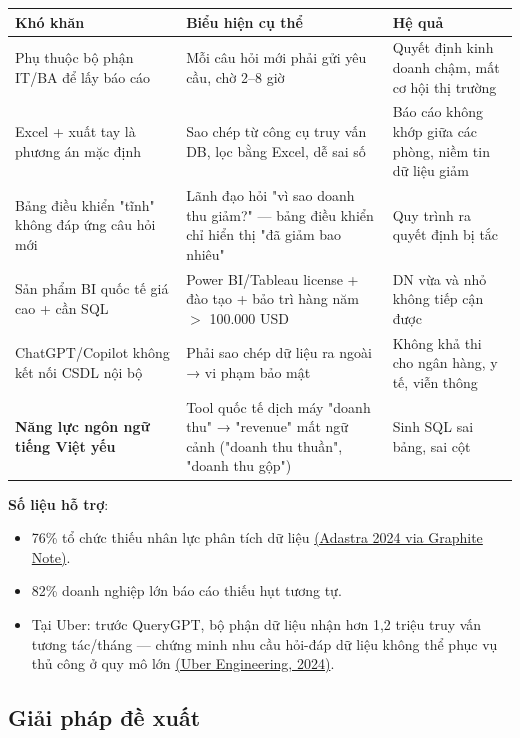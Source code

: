 \documentclass[11pt,a4paper]{article}
\begin{document}
\begin{longtable}{|L{4.2cm}|L{5.5cm}|L{5cm}|}
\hline
{}\textbf{Khó khăn} & \textbf{Biểu hiện cụ thể} & \textbf{Hệ quả} \\
\hline\endhead

Phụ thuộc bộ phận IT/BA để lấy báo cáo & Mỗi câu hỏi mới phải gửi yêu cầu, chờ 2--8 giờ & Quyết định kinh doanh chậm, mất cơ hội thị trường \\ \hline
Excel + xuất tay là phương án mặc định & Sao chép từ công cụ truy vấn DB, lọc bằng Excel, dễ sai số & Báo cáo không khớp giữa các phòng, niềm tin dữ liệu giảm \\ \hline
Bảng điều khiển "tĩnh" không đáp ứng câu hỏi mới & Lãnh đạo hỏi "vì sao doanh thu giảm?" --- bảng điều khiển chỉ hiển thị "đã giảm bao nhiêu" & Quy trình ra quyết định bị tắc \\ \hline
Sản phẩm BI quốc tế giá cao + cần SQL & Power BI/Tableau license + đào tạo + bảo trì hàng năm $>$ 100.000 USD & DN vừa và nhỏ không tiếp cận được \\ \hline
ChatGPT/Copilot không kết nối CSDL nội bộ & Phải sao chép dữ liệu ra ngoài → vi phạm bảo mật & Không khả thi cho ngân hàng, y tế, viễn thông \\ \hline
\textbf{Năng lực ngôn ngữ tiếng Việt yếu} & Tool quốc tế dịch máy "doanh thu" → "revenue" mất ngữ cảnh ("doanh thu thuần", "doanh thu gộp") & Sinh SQL sai bảng, sai cột \\ \hline

\end{longtable}

\textbf{Số liệu hỗ trợ}:
\begin{itemize}
\item 76\% tổ chức thiếu nhân lực phân tích dữ liệu \href{https://graphite-note.com/data-scientist-shortage/}{(Adastra 2024 via Graphite Note)}.
\item 82\% doanh nghiệp lớn báo cáo thiếu hụt tương tự.
\item Tại Uber: trước QueryGPT, bộ phận dữ liệu nhận hơn 1,2 triệu truy vấn tương tác/tháng --- chứng minh nhu cầu hỏi-đáp dữ liệu không thể phục vụ thủ công ở quy mô lớn \href{https://www.uber.com/us/en/blog/query-gpt/}{(Uber Engineering, 2024)}.
\end{itemize}

\subsection{Giải pháp đề xuất}
\end{document}
